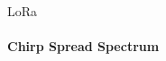 \begin{frame}{LoRa}
\framesubtitle{Chirp Spread Spectrum}
\begin{columns}
  \begin{column}{0.5\textwidth}
    
  \end{column}
  \begin{column}{0.5\textwidth}
    \begin{center}
    \end{center}
  \end{column}
\end{columns}
\end{frame}

